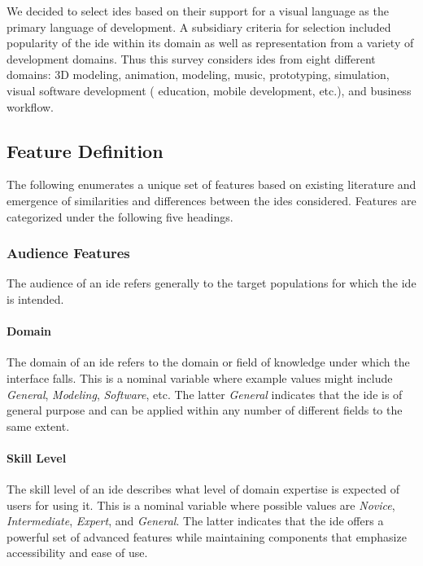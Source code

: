 We decided to select \acp{ide} based on their support for a visual language
as the primary language of development. A subsidiary criteria for
selection included popularity of the \ac{ide} within its domain as well as
representation from a variety of development domains. Thus this survey
considers \acp{ide} from eight different domains: 3D modeling, animation,
modeling, music, prototyping, simulation, visual software development (\eg
education, mobile development, etc.), and business workflow.


\subsection{Feature Definition} \label{subsec:featuredefinition}

The following enumerates a unique set of features based on existing literature and emergence of similarities and differences between the \acp{ide} considered.
Features are categorized under the following five headings.


\subsubsection{Audience Features} \label{subsubsec:audience}

The audience of an \ac{ide} refers generally to the target populations for which
the \ac{ide} is intended.


\paragraph{Domain}
The domain of an \ac{ide} refers to the domain or field of
knowledge under which the interface falls.
This is a nominal variable where example values might include \textsl{General}, \textsl{Modeling}, \textsl{Software}, etc.
The latter \textsl{General} indicates that the \ac{ide} is of general purpose and can be applied within any number of different fields to the same extent.


\paragraph{Skill Level}
The skill level of an \ac{ide} describes what level of domain expertise is expected of users for using it.
This is a nominal variable where possible values are \textsl{Novice}, \textsl{Intermediate}, \textsl{Expert}, and \textsl{General}.
The latter indicates that the \ac{ide} offers a powerful set of advanced features while maintaining components that emphasize accessibility and ease of use.


